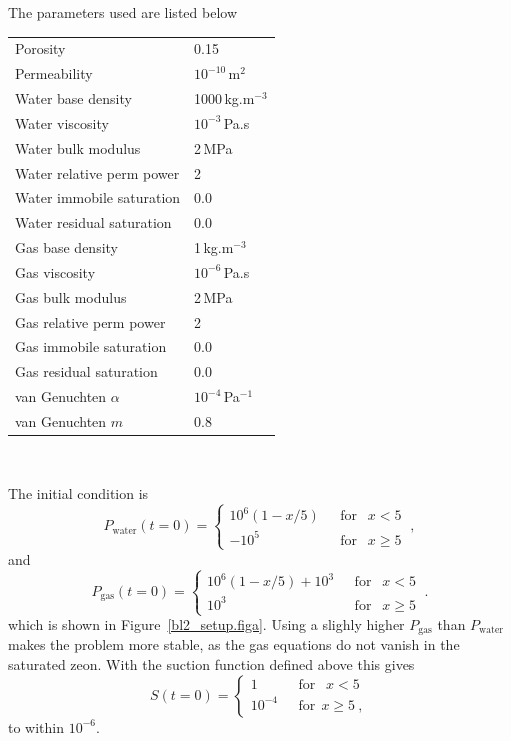 \documentclass[]{scrreprt}
\begin{document}
The parameters used are listed below
\begin{center}
\begin{tabular}{|ll|}
\hline
Porosity & 0.15 \\
Permeability & $ 10^{-10}$\,m$^{2}$ \\
\hline
Water base density & 1000\,kg.m$^{-3}$ \\
Water viscosity & $10^{-3}$\,Pa.s \\
Water bulk modulus & 2\,MPa \\
Water relative perm power & 2 \\
Water immobile saturation & 0.0 \\
Water residual saturation & 0.0 \\
\hline
Gas base density & 1\,kg.m$^{-3}$ \\
Gas viscosity & $10^{-6}$\,Pa.s \\
Gas bulk modulus & 2\,MPa \\
Gas relative perm power & 2 \\
Gas immobile saturation & 0.0 \\
Gas residual saturation & 0.0 \\
\hline
van Genuchten $\alpha$ & $10^{-4}$\,Pa$^{-1}$ \\
van Genuchten $m$ & 0.8 \\
\hline
\end{tabular} \\
\end{center}


The initial condition is
\begin{equation}
P_{\mathrm{water}}(t=0) = \left\{
\begin{array}{ll}
10^{6}(1-x/5) & \ \ \ \mbox{for }\ \ x<5 \\
-10^{5} & \ \ \ \mbox{for }\ \ x\geq 5  
\end{array}
\right. \ ,
\end{equation}
and
\begin{equation}
P_{\mathrm{gas}}(t=0) = \left\{
\begin{array}{ll}
10^{6}(1-x/5) + 10^{3} & \ \ \ \mbox{for }\ \ x<5 \\
10^{3} & \ \ \ \mbox{for }\ \ x\geq 5  
\end{array}
\right. \ .
\end{equation}
which is shown in Figure~\ref{bl2_setup.figa}.  Using a slighly higher
$P_{\mathrm{gas}}$ than $P_{\mathrm{water}}$ makes the problem more
stable, as the gas equations do not vanish in the saturated zeon.
With the suction function defined above this gives
\begin{equation}
S(t=0) = \left\{
\begin{array}{ll}
1 & \ \ \ \mbox{for }\ \ x < 5 \\
10^{-4} & \ \ \ \mbox{for} \ \ x \geq 5  \ ,
\end{array}
\right.
\end{equation}
to within $10^{-6}$.
\end{document}
